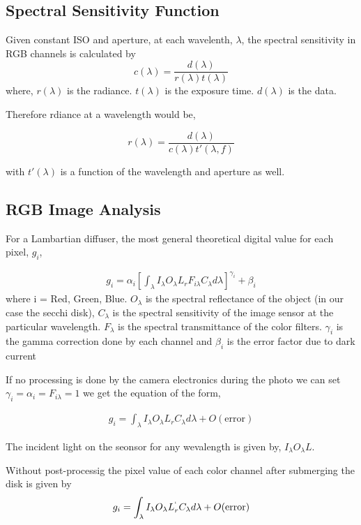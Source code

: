 \documentclass{article}
\begin{document}
\subsection{Spectral Sensitivity Function}

Given constant ISO and aperture, at each wavelenth, $ \lambda$, the spectral sensitivity
in RGB channels is calculated by
$$ c(\lambda) = \frac{d(\lambda)}{r(\lambda) t(\lambda)} $$
where, $ r(\lambda)$ is the radiance. $t(\lambda) $ is the exposure time.
$d(\lambda)$ is the data.

Therefore rdiance at a wavelength would be,

$$ r(\lambda) = \frac{d(\lambda)}{c(\lambda)t'(\lambda, f)} $$

with $t'(\lambda) $ is a function of the wavelength and aperture as well.

\subsection{RGB Image Analysis}
For a Lambartian diffuser, the most general theoretical digital value for each pixel, $ g_i$,

\begin{align}
  g_i = \alpha_i
  \left[\int_{\lambda}I_{\lambda}O_{\lambda} L_{r}F_{i\lambda}C_{\lambda} d\lambda\right]^{\gamma_{i}} + \beta_{i}
\end{align}
where i = {Red, Green, Blue}. $O_{\lambda}$ is the spectral reflectance of the object (in our case the secchi disk),
$C_{\lambda}$ is the spectral sensitivity of the image sensor at the particular wavelength.
$F_{\lambda}$ is the spectral transmittance of the color filters. $ \gamma_i$ is the gamma
correction done by each channel and $ \beta_{i}$ is the error factor due to dark current

If no processing is done by the camera electronics during the photo we can set
$ \gamma_i = \alpha_i = F_{i\lambda} =1$ we get the equation of the form,

\begin{align}
  g_i = \int_{\lambda} I_{\lambda}O_{\lambda} L_{r}C_{\lambda} d\lambda +O(\text{error})
\end{align}

The incident light on the seonsor for any wevalength is given by, $I_{\lambda} O_{\lambda} L$.

Without post-processig the pixel value of each color channel after submerging the disk is given by
\begin{align}
    g_i = \int_{\lambda} I_{\lambda}O_{\lambda} L^{`}_{r}C_{\lambda} d\lambda +O(\text{error})
\end{align}
\end{document}
